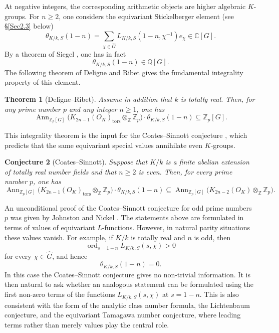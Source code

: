 \documentclass[a4paper,11pt]{article}
\newtheorem{theorem}{Theorem}[section]
\newtheorem{conject}[theorem]{Conjecture}
\begin{document}
\medskip

\noindent At negative integers, the corresponding arithmetic objects are higher
algebraic \(K\)-groups. For \(n\geq 2\), one considers the equivariant
Stickelberger element (see \S \ref{Sec2.3} below)
\[
\theta_{K/k,S}(1-n)
=
\sum_{\chi\in\widehat G}
L_{K/k,S}(1-n,\chi^{-1})e_\chi
\in \mathbb C[G].
\]
By a theorem of Siegel \cite{Siegel}, one has in fact
\[
\theta_{K/k,S}(1-n)\in\mathbb Q[G].
\]
The following theorem of Deligne and Ribet \cite{DeligneRibet} gives the fundamental integrality
property of this element.

\begin{theorem}[Deligne--Ribet]
\label{thm:DR-integrality-intro}
Assume in addition that \(k\) is totally real. Then, for any prime number \(p\)
and any integer \(n\geq 1\), one has
\[
\operatorname{Ann}_{\mathbb Z_p[G]}
\bigl(K_{2n-1}(O_K)_{\mathrm{tors}}\otimes_{\mathbb Z}\mathbb Z_p\bigr)
\cdot
\theta_{K/k,S}(1-n)
\subseteq
\mathbb Z_p[G].
\]
\end{theorem}

\noindent This integrality theorem is the input for the Coates--Sinnott conjecture \cite{Coates-Sinnott}, which
predicts that the same equivariant special values annihilate even
\(K\)-groups.

\begin{conject}[Coates--Sinnott]
\label{conj:CS-intro}
Suppose that \(K/k\) is a finite abelian extension of totally real number
fields and that \(n\geq 2\) is even. Then, for every prime number \(p\), one has
\[
\operatorname{Ann}_{\mathbb Z_p[G]}
\bigl(K_{2n-1}(O_K)_{\mathrm{tors}}\otimes_{\mathbb Z}\mathbb Z_p\bigr)
\cdot
\theta_{K/k,S}(1-n)
\subseteq
\operatorname{Ann}_{\mathbb Z_p[G]}
\bigl(K_{2n-2}(O_K)\otimes_{\mathbb Z}\mathbb Z_p\bigr).
\]
\end{conject}

\noindent An unconditional proof of the Coates--Sinnott conjecture for odd prime numbers $p$ was given by Johnston and Nickel
\cite{JohnstonNickel}.
The statements above are formulated in terms of values of equivariant
\(L\)-functions. However, in natural parity situations these values vanish. For
example, if \(K/k\) is totally real and \(n\) is odd, then
\[
\operatorname{ord}_{s=1-n}L_{K/k,S}(s,\chi)>0
\]
for every \(\chi\in\widehat G\), and hence
\[
\theta_{K/k,S}(1-n)=0.
\]
In this case the Coates--Sinnott conjecture gives no non-trivial information.
It is then natural to ask whether an analogous statement can be formulated
using the first non-zero terms of the functions
\(L_{K/k,S}(s,\chi)\) at \(s=1-n\). This is also consistent with the form of
the analytic class number formula, the Lichtenbaum conjecture, and the
equivariant Tamagawa number conjecture, where leading terms rather than merely
values play the central role.
\end{document}
